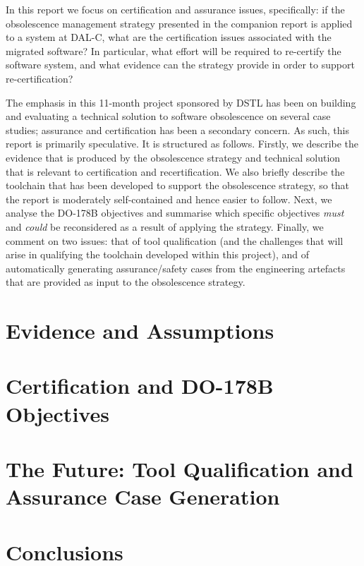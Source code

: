 \documentclass{llncs}
\begin{document}
In this report we focus on certification and assurance issues, specifically: if the obsolescence management strategy
presented in the companion report is applied to a system at DAL-C, what are the certification issues associated with
the migrated software? In particular, what effort will be required to re-certify the software system, and what evidence
can the strategy provide in order to support re-certification?

The emphasis in this 11-month project sponsored by DSTL has been on building and evaluating a technical solution to
software obsolescence on several case studies; assurance and certification has been a secondary concern. As such, this
report is primarily speculative. It is structured as follows. Firstly, we describe the evidence that is produced by the 
obsolescence strategy and technical solution that is relevant to certification and recertification. We also briefly describe
the toolchain that has been developed to support the obsolescence strategy, so that the report is moderately self-contained
and hence easier to follow. Next, we analyse the DO-178B objectives and summarise which specific objectives \textit{must} and
\textit{could} be reconsidered as a result of applying the strategy. Finally, we comment on two issues: that of tool qualification
(and the challenges that will arise in qualifying the toolchain developed within this project), and of automatically generating 
assurance/safety cases from the engineering artefacts that are provided as input to the obsolescence strategy.

\section{Evidence and Assumptions}

\section{Certification and DO-178B Objectives}

\section{The Future: Tool Qualification and Assurance Case Generation}

\section{Conclusions}



\renewcommand{\baselinestretch}{1.0}
\end{document}
